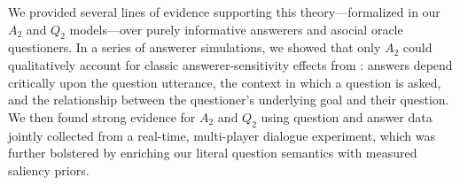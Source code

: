 \documentclass[12pt, floatsintext, jou]{apa6}
\begin{document}
We provided several lines of evidence supporting this theory---formalized in our $A_2$ and $Q_2$ models---over purely informative answerers and asocial oracle questioners. In a series of answerer simulations, we showed that only $A_2$ could qualitatively account for classic answerer-sensitivity effects from : answers depend critically upon the question utterance, the context in which a question is asked, and the relationship between the questioner's underlying goal and their question. We then found strong evidence for $A_2$ and $Q_2$ using question and answer data jointly collected from a real-time, multi-player dialogue experiment, which was further bolstered by enriching our literal question semantics with measured saliency priors. %


\end{document}
